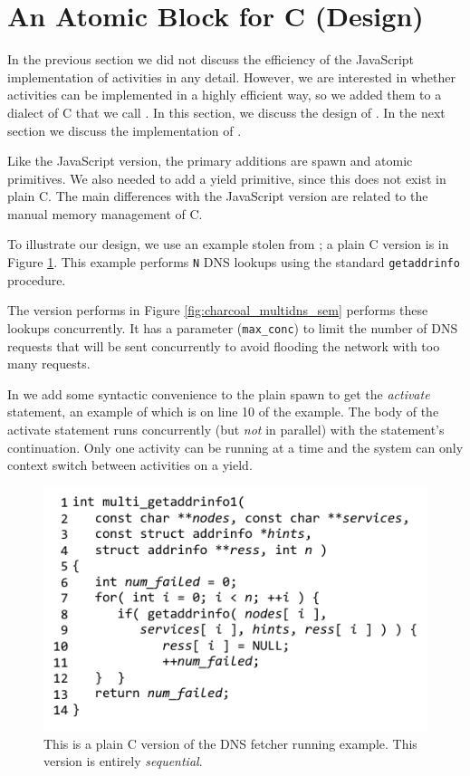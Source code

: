 \documentclass[acmsmall,anonymous,review]{acmart}\settopmatter{printfolios=true,printccs=false,printacmref=false}
\begin{document}
\section{An Atomic Block for C (Design)}

In the previous section we did not discuss the efficiency of the JavaScript implementation of activities in any detail.
However, we are interested in whether activities can be implemented in a highly efficient way, so we added them to a dialect of C that we call \charcoal{}.
In this section, we discuss the design of \charcoal{}.
In the next section we discuss the implementation of \charcoal{}.

Like the JavaScript version, the primary additions are spawn and atomic primitives.
We also needed to add a yield primitive, since this does not exist in plain C.
The main differences with the JavaScript version are related to the manual memory management of C.

To illustrate our design, we use an example stolen from \cite{Krohn2007}; a plain C version is in Figure \ref{fig:charcoal_multidns_seq}.
This example performs \texttt{N} DNS lookups using the standard \texttt{getaddrinfo} procedure.

The \charcoal{} version performs in Figure \ref{fig:charcoal_multidns_sem} performs these lookups concurrently.
It has a parameter (\texttt{max\_conc}) to limit the number of DNS requests that will be sent concurrently to avoid flooding the network with too many requests.

In \charcoal{} we add some syntactic convenience to the plain spawn to get the \emph{activate} statement, an example of which is on line 10 of the example.
The body of the activate statement runs concurrently (but \emph{not} in parallel) with the statement's continuation.
Only one activity can be running at a time and the system can only context switch between activities on a yield.

\begin{figure}
\includegraphics{multi_getaddrinfo_seq}
\caption{This is a plain C version of the DNS fetcher running example.
  This version is entirely \emph{sequential}.}
\label{fig:charcoal_multidns_seq}
\end{figure}
\end{document}
